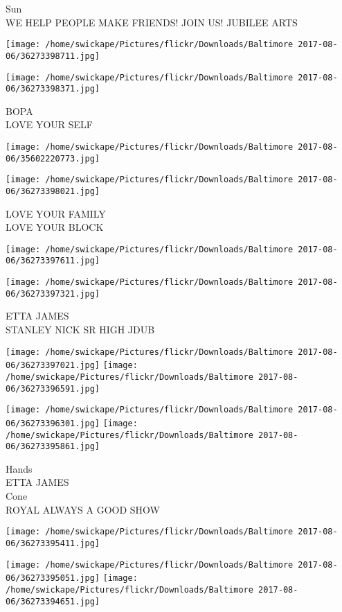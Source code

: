 \documentclass[10pt,letterpaper]{article}
\begin{document}
Sun\\
WE HELP PEOPLE MAKE FRIENDS!  JOIN US!  JUBILEE ARTS
\pagebreak

\texttt{[image: /home/swickape/Pictures/flickr/Downloads/Baltimore 2017-08-06/36273398711.jpg]}

\vspace{0.25in}
\texttt{[image: /home/swickape/Pictures/flickr/Downloads/Baltimore 2017-08-06/36273398371.jpg]}

BOPA\\
LOVE YOUR SELF
\pagebreak

\texttt{[image: /home/swickape/Pictures/flickr/Downloads/Baltimore 2017-08-06/35602220773.jpg]}

\vspace{0.25in}
\texttt{[image: /home/swickape/Pictures/flickr/Downloads/Baltimore 2017-08-06/36273398021.jpg]}

LOVE YOUR FAMILY\\
LOVE YOUR BLOCK
\pagebreak

\texttt{[image: /home/swickape/Pictures/flickr/Downloads/Baltimore 2017-08-06/36273397611.jpg]}

\vspace{0.25in}
\texttt{[image: /home/swickape/Pictures/flickr/Downloads/Baltimore 2017-08-06/36273397321.jpg]}

ETTA JAMES\\
STANLEY NICK SR HIGH JDUB
\pagebreak

\texttt{[image: /home/swickape/Pictures/flickr/Downloads/Baltimore 2017-08-06/36273397021.jpg]}
\texttt{[image: /home/swickape/Pictures/flickr/Downloads/Baltimore 2017-08-06/36273396591.jpg]}

\texttt{[image: /home/swickape/Pictures/flickr/Downloads/Baltimore 2017-08-06/36273396301.jpg]}
\texttt{[image: /home/swickape/Pictures/flickr/Downloads/Baltimore 2017-08-06/36273395861.jpg]}

Hands\\
ETTA JAMES\\
Cone\\
ROYAL ALWAYS A GOOD SHOW
\pagebreak

\texttt{[image: /home/swickape/Pictures/flickr/Downloads/Baltimore 2017-08-06/36273395411.jpg]}

\vspace{0.25in}
\texttt{[image: /home/swickape/Pictures/flickr/Downloads/Baltimore 2017-08-06/36273395051.jpg]}
\texttt{[image: /home/swickape/Pictures/flickr/Downloads/Baltimore 2017-08-06/36273394651.jpg]}
\end{document}
